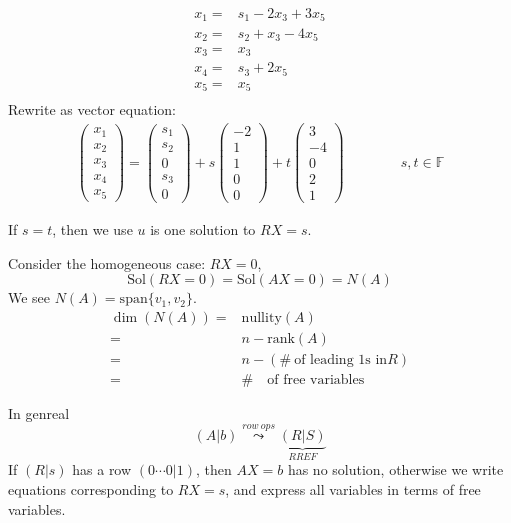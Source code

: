 \documentclass[12pt]{article}
\newcommand{\Span}{\mathrm{span}}
\newcommand{\rank}{\mathrm{rank}}
\newcommand{\nullity}{\mathrm{nullity}}
\newcommand{\Sol}{\mathrm{Sol}}
\newcommand{\mF}{{\mathbb{F}}}
\begin{document}
{	\begin{align*}
		x_1 =& s_1 - 2x_3 + 3x_5	\\
		x_2 =& s_2 + x_3 - 4x_5		\\
		x_3 =& x_3					\\
		x_4 =& s_3 + 2x_5			\\
		x_5 =& x_5					\\
	\end{align*}
	Rewrite as vector equation: 
	\begin{align*}
		\begin{pmatrix}
			x_1	\\
			x_2	\\
			x_3	\\
			x_4	\\
			x_5
		\end{pmatrix}
		= 
		\begin{pmatrix}
			s_1	\\
			s_2	\\
			0	\\
			s_3	\\
			0
		\end{pmatrix}
		+
		s
		\begin{pmatrix}
			-2	\\
			1	\\
			1	\\
			0	\\
			0	
		\end{pmatrix}
		+ 
		t
		\begin{pmatrix}
			3	\\
			-4	\\
			0	\\
			2	\\
			1
		\end{pmatrix}
		\qquad \qquad s,t \in \mF
	\end{align*}

	If $s = t$, then we use $u$ is one solution to $RX = s$. 

	Consider the homogeneous case: $RX = 0$,
	\[
		\Sol(RX = 0) = \Sol(AX = 0) = N(A)
	\]
	We see $N(A) = \Span\{v_1, v_2\}$. 
	\begin{align*}
		\dim(N(A)) 
		=& \nullity(A)	\\
		=& n -\rank(A)	\\
		=& n - (\#\  \text{of leading 1s in} R)	\\
		=& \# \quad \text{of free variables}
	\end{align*}
}
In genreal 
\[
	(A|b) \overset{row \ ops}{\leadsto} \underbrace{(R|S)}_{RREF}
\]
If $(R|s)$ has a row $(0 \cdots 0 | 1)$, then $AX=b$ has no solution, 
otherwise we write equations corresponding to $RX=s$, and express all 
variables in terms of free variables. 
\end{document}
